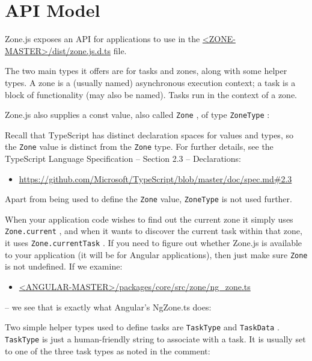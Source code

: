 \section{API Model}

Zone.js exposes an API for applications to use in the
\href{https://github.com/angular/zone.js/blob/master/dist/zone.js.d.ts}
{<ZONE-MASTER>/dist/zone.js.d.ts}
file.

The two main types it offers are for tasks and zones, along with some helper types. A
zone is a (usually named) asynchronous execution context; a task is a block of
functionality (may also be named). Tasks run in the context of a zone.

Zone.js also supplies a const value, also called
\texttt{Zone}
, of type
\texttt{ZoneType}
:



Recall that TypeScript has distinct declaration spaces for values and types, so the
\texttt{Zone}
value is distinct from the
\texttt{Zone}
type. For further details, see the TypeScript
Language Specification – Section 2.3 – Declarations:

\begin{itemize}
  \item \url{https://github.com/Microsoft/TypeScript/blob/master/doc/spec.md#2.3}
\end{itemize}

Apart from being used to define the
\texttt{Zone}
value,
\texttt{ZoneType}
is not used further.

When your application code wishes to find out the current zone it simply uses
\texttt{Zone.current}
, and when it wants to discover the current task within that zone, it
uses
\texttt{Zone.currentTask}
. If you need to figure out whether Zone.js is available to your
application (it will be for Angular applications), then just make sure
\texttt{Zone}
is not
undefined. If we examine:

\begin{itemize}
  \item \href{https://github.com/angular/angular/blob/master/packages/core/src/zone/ng_zone.ts}
        {<ANGULAR-MASTER>/packages/core/src/zone/ng\_zone.ts}
\end{itemize}

– we see that is exactly what Angular’s NgZone.ts does:



Two simple helper types used to define tasks are
\texttt{TaskType}
and
\texttt{TaskData}
.
\texttt{TaskType}
is just a human-friendly string to associate with a task. It is usually set to one of the
three task types as noted in the comment:

